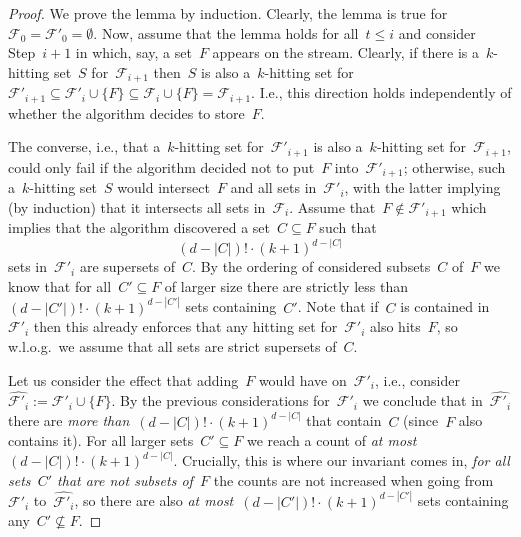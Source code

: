 \documentclass[draft,a4paper]{llncs}
\newcommand{\F}{\ensuremath{\mathcal{F}}\xspace}
\begin{document}
\begin{proof}
We prove the lemma by induction. Clearly, the lemma is true for~$\F_0=\F'_0=\emptyset$. Now, assume that the lemma holds for all~$t\leq i$ and consider Step~$i+1$ in which, say, a set~$F$ appears on the stream.
Clearly, if there is a~$k$-hitting set~$S$ for~$\F_{i+1}$ then~$S$ is also a~$k$-hitting set for~$\F'_{i+1}\subseteq\F'_i\cup\{F\}\subseteq \F_i\cup\{F\}=\F_{i+1}$. I.e., this direction holds independently of whether the algorithm decides to store~$F$.

The converse, i.e., that a~$k$-hitting set for~$\F'_{i+1}$ is also a~$k$-hitting set for~$\F_{i+1}$, could only fail if the algorithm decided not to put~$F$ into~$\F'_{i+1}$; otherwise, such a~$k$-hitting set~$S$ would intersect~$F$ and all sets in~$\F'_i$, with the latter implying (by induction) that it intersects all sets in~$\F_i$. Assume that~$F\notin\F'_{i+1}$ which implies that the algorithm discovered a set~$C\subseteq F$ such that
\[
(d-|C|)!\cdot (k+1)^{d-|C|} 
\]
sets in~$\F'_i$ are supersets of~$C$. By the ordering of considered subsets~$C$ of~$F$ we know that for all~$C'\subseteq F$ of larger size there are strictly less than~$(d-|C'|)!\cdot (k+1)^{d-|C'|}$ sets containing~$C'$. Note that if~$C$ is contained in~$\F'_i$ then this already enforces that any hitting set for~$\F'_i$ also hits~$F$, so w.l.o.g.\ we assume that all sets are strict supersets of~$C$.

Let us consider the effect that adding~$F$ would have on~$\F'_i$, i.e., consider~$\hat{\F'_i}:=\F'_i\cup\{F\}$. By the previous considerations for~$\F'_i$ we conclude that in~$\hat{\F'_i}$ there are \emph{more than}~$(d-|C|)!\cdot (k+1)^{d-|C|}$ that contain~$C$ (since~$F$ also contains it). For all larger sets~$C'\subseteq F$ we reach a count of \emph{at most}~$(d-|C|)!\cdot (k+1)^{d-|C|}$. Crucially, this is where our invariant comes in, \emph{for all sets~$C'$ that are not subsets of~$F$} the counts are not increased when going from~$\F'_i$ to~$\hat{\F'_i}$, so there are also \emph{at most}~$(d-|C'|)!\cdot (k+1)^{d-|C'|}$ sets containing any~$C'\nsubseteq F$.


\end{proof}
\end{document}

